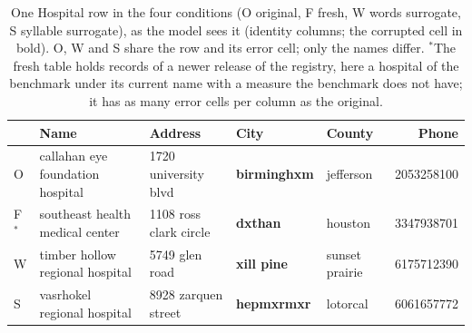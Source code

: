 \begin{table}[t]
  \caption{One Hospital row in the four conditions (O original, F fresh, W words surrogate, S syllable surrogate), as the
  model sees it (identity columns; the corrupted cell in bold).
  O, W and S share the row and its error cell; only the names differ. $^*$The fresh table holds records of a newer
  release of the registry, here a hospital of the benchmark under its current name with a measure the benchmark does
  not have; it has as many error cells per column as the original.}
  \label{tab:example}
  \small
  \begin{tabular*}{\textwidth}{@{\extracolsep{\fill}}lllllr@{}}
    \toprule
    & Name & Address & City & County & Phone \\
    \midrule
    O & callahan eye foundation hospital & 1720 university blvd & \textbf{birminghxm} & jefferson & 2053258100 \\
    F$^*$ & southeast health medical center & 1108 ross clark circle & \textbf{dxthan} & houston & 3347938701 \\
    W & timber hollow regional hospital & 5749 glen road & \textbf{xill pine} & sunset prairie & 6175712390 \\
    S & vasrhokel regional hospital & 8928 zarquen street & \textbf{hepmxrmxr} & lotorcal & 6061657772 \\
    \bottomrule
  \end{tabular*}
\end{table}
